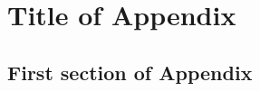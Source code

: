 \documentclass[12pt]{nuthesis}	%
\begin{document}

%

%


%
%

% 



\appendix		%


\chapter{Title of Appendix}	%

\section{First section of Appendix}	%
\end{document}
